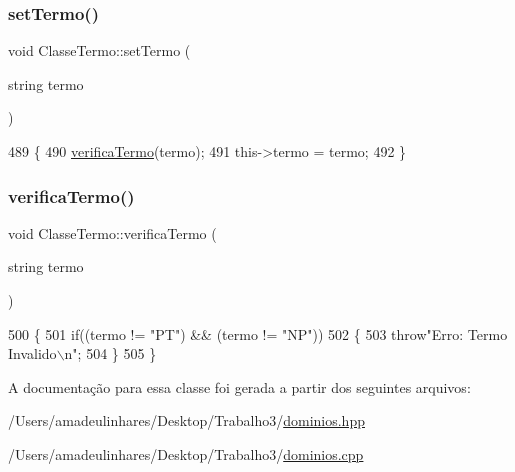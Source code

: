 \subsubsection{\texorpdfstring{set\+Termo()}{setTermo()}}
{\footnotesize\ttfamily void Classe\+Termo\+::set\+Termo (\begin{DoxyParamCaption}\item[{string}]{termo }\end{DoxyParamCaption})}


\begin{DoxyCode}
489 \{
490   \mbox{\hyperlink{class_classe_termo_a950f042edfb8e2e40caafba76a636c93}{verificaTermo}}(termo);
491   this->termo = termo;
492 \}
\end{DoxyCode}
\mbox{\label{class_classe_termo_a950f042edfb8e2e40caafba76a636c93}} 
\subsubsection{\texorpdfstring{verifica\+Termo()}{verificaTermo()}}
{\footnotesize\ttfamily void Classe\+Termo\+::verifica\+Termo (\begin{DoxyParamCaption}\item[{string}]{termo }\end{DoxyParamCaption})}


\begin{DoxyCode}
500 \{
501   \textcolor{keywordflow}{if}((termo != \textcolor{stringliteral}{"PT"}) && (termo != \textcolor{stringliteral}{"NP"}))
502   \{
503     \textcolor{keywordflow}{throw}\textcolor{stringliteral}{"Erro: Termo Invalido\(\backslash\)n"};
504   \}
505 \}
\end{DoxyCode}


A documentação para essa classe foi gerada a partir dos seguintes arquivos\+:\begin{DoxyCompactItemize}
\item 
/\+Users/amadeulinhares/\+Desktop/\+Trabalho3/\mbox{\hyperlink{dominios_8hpp}{dominios.\+hpp}}\item 
/\+Users/amadeulinhares/\+Desktop/\+Trabalho3/\mbox{\hyperlink{dominios_8cpp}{dominios.\+cpp}}\end{DoxyCompactItemize}
